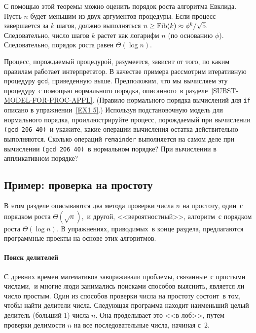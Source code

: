 С помощью этой теоремы можно оценить порядок роста 
алгоритма Евклида.  Пусть $n$ будет меньшим из двух
аргументов процедуры. Если процесс завершается за $k$
шагов, должно выполняться $n \ge \mathop{\rm Fib} (k) \approx
\phi^k / \sqrt{5}$. Следовательно, число шагов
$k$ растет как логарифм $n$ (по основанию
$\phi$). Следовательно, порядок роста равен
$\Theta(\log n)$.

\begin{exercise}{1.20}%
Процесс, порождаемый процедурой, разумеется, зависит от
того, по каким
правилам работает интерпретатор. В качестве примера 
рассмотрим итеративную процедуру {\tt gcd}, приведенную выше.
Предположим, что мы вычисляем эту процедуру~с помощью нормального
порядка,  описанного~в разделе~\ref{SUBST-MODEL-FOR-PROC-APPL}.
(Правило нормального порядка вычислений для {\tt if} описано в
упражнении~\ref{EX1.5}.) Используя подстановочную модель для 
нормального порядка, проиллюстрируйте процесс, порождаемый при
вычислении {\tt (gcd 206 40)}~и укажите, какие операции
вычисления остатка действительно выполняются. Сколько операций
{\tt remainder} выполняется на самом деле при вычислении
{\tt (gcd 206 40)}~в нормальном порядке?  При вычислении в
аппликативном порядке?
\end{exercise}

\subsection{Пример: проверка на простоту}
\label{EXAMPLE-TESTING-FOR-PRIMALITY}

В этом разделе описываются два метода проверки числа
$n$ на простоту, один~с порядком роста $\Theta
(\sqrt{n})$,~и другой, <<вероятностный>>, алгоритм~с порядком
роста $\Theta(\log n)$. В упражнениях, приводимых~в конце
раздела, предлагаются программные проекты на основе этих
алгоритмов.

\paragraph{Поиск делителей}

С древних времен математиков завораживали проблемы,
связанные~с простыми числами,~и многие люди занимались поисками
способов выяснить, является ли число простым.  Один из способов
проверки числа на простоту состоит~в том, чтобы найти делители числа.
Следующая программа находит наименьший целый делитель (больший 1)
числа $n$.  Она проделывает это <<в лоб>>, путем проверки
делимости $n$ на все последовательные числа, начиная с~2.

